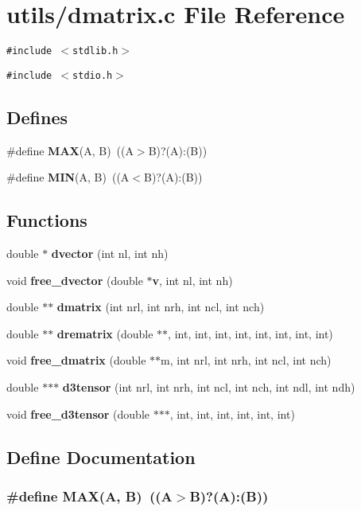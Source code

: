 \section{utils/dmatrix.c File Reference}
\label{dmatrix_8c}
{\tt \#include $<$stdlib.h$>$}\par
{\tt \#include $<$stdio.h$>$}\par
\subsection*{Defines}
\begin{CompactItemize}
\item 
\#define {\bf MAX}(A, B)~((A$>$B)?(A):(B))
\item 
\#define {\bf MIN}(A, B)~((A$<$B)?(A):(B))
\end{CompactItemize}
\subsection*{Functions}
\begin{CompactItemize}
\item 
double $\ast$ {\bf dvector} (int nl, int nh)
\item 
void {\bf free\_\-dvector} (double $\ast${\bf v}, int nl, int nh)
\item 
double $\ast$$\ast$ {\bf dmatrix} (int nrl, int nrh, int ncl, int nch)
\item 
double $\ast$$\ast$ {\bf drematrix} (double $\ast$$\ast$, int, int, int, int, int, int, int, int)
\item 
void {\bf free\_\-dmatrix} (double $\ast$$\ast$m, int nrl, int nrh, int ncl, int nch)
\item 
double $\ast$$\ast$$\ast$ {\bf d3tensor} (int nrl, int nrh, int ncl, int nch, int ndl, int ndh)
\item 
void {\bf free\_\-d3tensor} (double $\ast$$\ast$$\ast$, int, int, int, int, int, int)
\end{CompactItemize}


\subsection{Define Documentation}
\subsubsection{\setlength{\rightskip}{0pt plus 5cm}\#define MAX(A, B)~((A$>$B)?(A):(B))}\label{dmatrix_8c_d935f1ff1a50822e317bdb321ce991ad}



